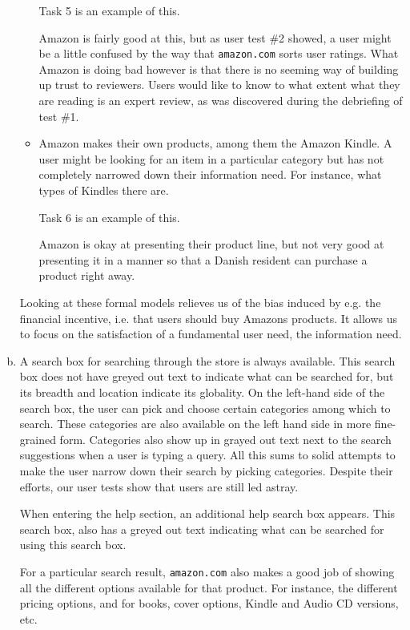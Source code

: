\begin{enumerate}[a.]
\begin{itemize}
Task 5 is an example of this.

Amazon is fairly good at this, but as user test \#2 showed, a user might be a
little confused by the way that \texttt{amazon.com} sorts user ratings. What
Amazon is doing bad however is that there is no seeming way of building up
trust to reviewers. Users would like to know to what extent what they are
reading is an expert review, as was discovered during the debriefing of test
\#1.

\item Amazon makes their own products, among them the Amazon Kindle. A user
might be looking for an item in a particular category but has not completely
narrowed down their information need. For instance, what types of Kindles there
are.

Task 6 is an example of this.

Amazon is okay at presenting their product line, but not very good at
presenting it in a manner so that a Danish resident can purchase a product
right away.

\end{itemize}

Looking at these formal models relieves us of the bias induced by e.g. the
financial incentive, i.e. that users should buy Amazons products. It allows us
to focus on the satisfaction of a fundamental user need, the information need.

\item

A search box for searching through the store is always available. This search
box does not have greyed out text to indicate what can be searched for, but its
breadth and location indicate its globality\cite[\textsection\ 1.7,
1.10]{hearst}. On the left-hand side of the search box, the user can pick and
choose certain categories among which to search. These categories are also
available on the left hand side in more fine-grained form. Categories also show
up in grayed out text next to the search suggestions when a user is typing a
query. All this sums to solid attempts to make the user narrow down their
search by picking categories\cite[\textsection\ 8.2]{hearst}. Despite their
efforts, our user tests show that users are still led astray.

When entering the help section, an additional help search box appears. This
search box, also has a greyed out text indicating what can be searched for
using this search box.

For a particular search result, \texttt{amazon.com} also makes a good job of
showing all the different options available for that product. For instance, the
different pricing options, and for books, cover options, Kindle and Audio CD
versions, etc.


\end{enumerate}
